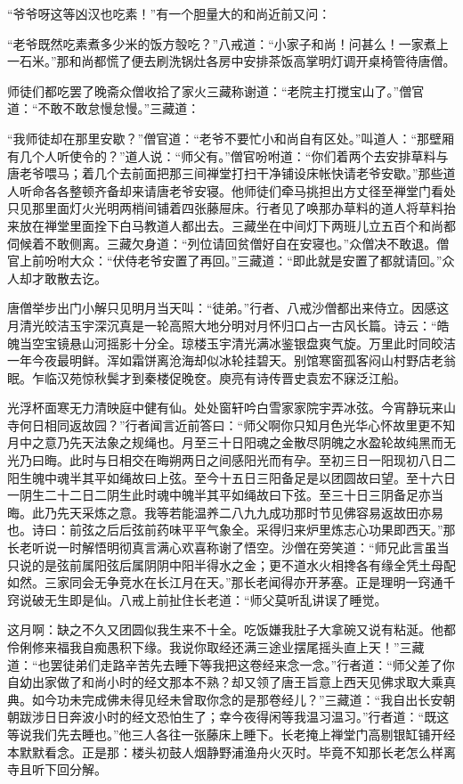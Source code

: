 \documentclass[12pt,UTF8]{ctexbook}
\begin{document}
{“爷爷呀这等凶汉也吃素！”有一个胆量大的和尚近前又问：

“老爷既然吃素煮多少米的饭方彀吃？”八戒道：“小家子和尚！问甚么！一家煮上一石米。”那和尚都慌了便去刷洗锅灶各房中安排茶饭高掌明灯调开桌椅管待唐僧。

师徒们都吃罢了晚斋众僧收拾了家火三藏称谢道：“老院主打搅宝山了。”僧官道：“不敢不敢怠慢怠慢。”三藏道：

“我师徒却在那里安歇？”僧官道：“老爷不要忙小和尚自有区处。”叫道人：“那壁厢有几个人听使令的？”道人说：“师父有。”僧官吩咐道：“你们着两个去安排草料与唐老爷喂马；着几个去前面把那三间禅堂打扫干净铺设床帐快请老爷安歇。”那些道人听命各各整顿齐备却来请唐老爷安寝。他师徒们牵马挑担出方丈径至禅堂门看处只见那里面灯火光明两梢间铺着四张藤屉床。行者见了唤那办草料的道人将草料抬来放在禅堂里面拴下白马教道人都出去。三藏坐在中间灯下两班儿立五百个和尚都伺候着不敢侧离。三藏欠身道：“列位请回贫僧好自在安寝也。”众僧决不敢退。僧官上前吩咐大众：“伏侍老爷安置了再回。”三藏道：“即此就是安置了都就请回。”众人却才敢散去讫。

唐僧举步出门小解只见明月当天叫：“徒弟。”行者、八戒沙僧都出来侍立。因感这月清光皎洁玉宇深沉真是一轮高照大地分明对月怀归口占一古风长篇。诗云：“皓魄当空宝镜悬山河摇影十分全。琼楼玉宇清光满冰鉴银盘爽气旋。万里此时同皎洁一年今夜最明鲜。浑如霜饼离沧海却似冰轮挂碧天。别馆寒窗孤客闷山村野店老翁眠。乍临汉苑惊秋鬓才到秦楼促晚奁。庾亮有诗传晋史袁宏不寐泛江船。

光浮杯面寒无力清映庭中健有仙。处处窗轩吟白雪家家院宇弄冰弦。今宵静玩来山寺何日相同返故园？”行者闻言近前答曰：“师父啊你只知月色光华心怀故里更不知月中之意乃先天法象之规绳也。月至三十日阳魂之金散尽阴魄之水盈轮故纯黑而无光乃曰晦。此时与日相交在晦朔两日之间感阳光而有孕。至初三日一阳现初八日二阳生魄中魂半其平如绳故曰上弦。至今十五日三阳备足是以团圆故曰望。至十六日一阴生二十二日二阴生此时魂中魄半其平如绳故曰下弦。至三十日三阴备足亦当晦。此乃先天采炼之意。我等若能温养二八九九成功那时节见佛容易返故田亦易也。诗曰：前弦之后后弦前药味平平气象全。采得归来炉里炼志心功果即西天。”那长老听说一时解悟明彻真言满心欢喜称谢了悟空。沙僧在旁笑道：“师兄此言虽当只说的是弦前属阳弦后属阴阴中阳半得水之金；更不道水火相搀各有缘全凭土母配如然。三家同会无争竞水在长江月在天。”那长老闻得亦开茅塞。正是理明一窍通千窍说破无生即是仙。八戒上前扯住长老道：“师父莫听乱讲误了睡觉。

这月啊：缺之不久又团圆似我生来不十全。吃饭嫌我肚子大拿碗又说有粘涎。他都伶俐修来福我自痴愚积下缘。我说你取经还满三途业摆尾摇头直上天！”三藏道：“也罢徒弟们走路辛苦先去睡下等我把这卷经来念一念。”行者道：“师父差了你自幼出家做了和尚小时的经文那本不熟？却又领了唐王旨意上西天见佛求取大乘真典。如今功未完成佛未得见经未曾取你念的是那卷经儿？”三藏道：“我自出长安朝朝跋涉日日奔波小时的经文恐怕生了；幸今夜得闲等我温习温习。”行者道：“既这等说我们先去睡也。”他三人各往一张藤床上睡下。长老掩上禅堂门高剔银缸铺开经本默默看念。正是那：楼头初鼓人烟静野浦渔舟火灭时。毕竟不知那长老怎么样离寺且听下回分解。

}
\end{document}
